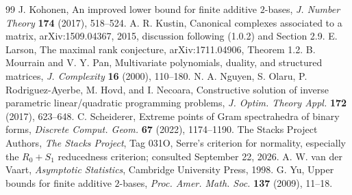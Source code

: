 \begin{thebibliography}{99}
 J. Kohonen, An improved lower bound for finite additive $2$-bases, \emph{J. Number Theory} \textbf{174} (2017), 518--524.
 A. R. Kustin, Canonical complexes associated to a matrix, arXiv:1509.04367, 2015, discussion following (1.0.2) and Section 2.9.
 E. Larson, The maximal rank conjecture, arXiv:1711.04906, Theorem 1.2.
 B. Mourrain and V. Y. Pan, Multivariate polynomials, duality, and structured matrices, \emph{J. Complexity} \textbf{16} (2000), 110--180.
 N. A. Nguyen, S. Olaru, P. Rodriguez-Ayerbe, M. Hovd, and I. Necoara, Constructive solution of inverse parametric linear/quadratic programming problems, \emph{J. Optim. Theory Appl.} \textbf{172} (2017), 623--648.
 C. Scheiderer, Extreme points of Gram spectrahedra of binary forms, \emph{Discrete Comput. Geom.} \textbf{67} (2022), 1174--1190.
 The Stacks Project Authors, \emph{The Stacks Project}, Tag 031O, Serre's criterion for normality, especially the $R_0+S_1$ reducedness criterion; consulted September 22, 2026.
 A. W. van der Vaart, \emph{Asymptotic Statistics}, Cambridge University Press, 1998.
 G. Yu, Upper bounds for finite additive $2$-bases, \emph{Proc. Amer. Math. Soc.} \textbf{137} (2009), 11--18.
\end{thebibliography}

